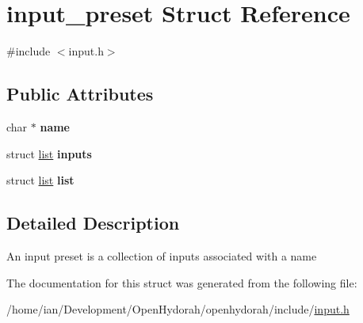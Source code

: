 \hypertarget{structinput__preset}{\section{input\-\_\-preset Struct Reference}
\label{structinput__preset}
}


{\ttfamily \#include $<$input.\-h$>$}

\subsection*{Public Attributes}
\begin{DoxyCompactItemize}
\item 
\hypertarget{structinput__preset_a1f8f4330511eca3dc8bde399e4cf9342}{char $\ast$ {\bfseries name}}\label{structinput__preset_a1f8f4330511eca3dc8bde399e4cf9342}

\item 
\hypertarget{structinput__preset_ab42f38eef3e8aa7995a3a7bebe6ac1de}{struct \hyperlink{structlist}{list} {\bfseries inputs}}\label{structinput__preset_ab42f38eef3e8aa7995a3a7bebe6ac1de}

\item 
\hypertarget{structinput__preset_aa243bb72ea7981b1f8ca35af0a408f16}{struct \hyperlink{structlist}{list} {\bfseries list}}\label{structinput__preset_aa243bb72ea7981b1f8ca35af0a408f16}

\end{DoxyCompactItemize}


\subsection{Detailed Description}
An input preset is a collection of inputs associated with a name 

The documentation for this struct was generated from the following file\-:\begin{DoxyCompactItemize}
\item 
/home/ian/\-Development/\-Open\-Hydorah/openhydorah/include/\hyperlink{input_8h}{input.\-h}\end{DoxyCompactItemize}
